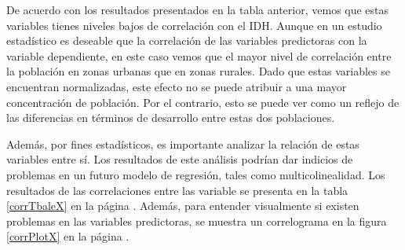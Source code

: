 \documentclass{article}
\begin{document}
De acuerdo con los resultados presentados en la tabla anterior, vemos que estas variables tienes niveles bajos de correlación con el IDH. Aunque en un estudio estadístico es deseable que la correlación de las variables predictoras con la variable dependiente, en este caso vemos que el mayor nivel de correlación entre la población en zonas urbanas que en zonas rurales. Dado que estas variables se encuentran normalizadas, este efecto no se puede atribuir a una mayor concentración de población. Por el contrario, esto se puede ver como un reflejo de las diferencias en términos de desarrollo entre estas dos poblaciones.

Además, por fines estadísticos, es importante analizar la relación de estas variables entre sí. Los resultados de este análisis podrían dar indicios de problemas en un futuro modelo de regresión, tales como multicolinealidad. Los resultados de las correlaciones entre las variable se presenta en la tabla \ref {corrTbaleX} en la página \pageref{corrTableX}. Además, para entender visualmente si existen problemas en las variables predictoras, se muestra un correlograma en la figura \ref{corrPlotX} en la página \pageref{corrPlotX}.
\end{document}
